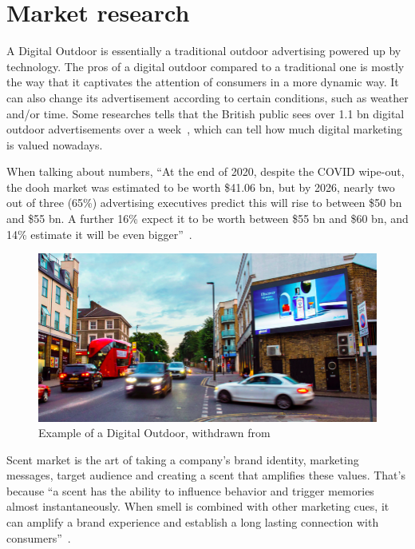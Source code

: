 \section{Market research}
\label{sec:market-research}
A Digital Outdoor is essentially a traditional outdoor advertising powered up by technology. 
The pros of a digital outdoor compared to a traditional one is mostly the way that it captivates the attention of consumers in a more dynamic way. 
It can also change its advertisement according to certain conditions, such as
weather and/or time. Some researches tells that the British public sees over 1.1
\gls{bn} digital outdoor advertisements over a week~\cite{digital-outdoor},
which can tell how much digital marketing is valued nowadays.

When talking about numbers, ``At the end of 2020, despite the COVID wipe-out, the \gls{dooh} market was estimated to be worth \$41.06 \gls{bn}, but by 2026, nearly two out of three (65\%) advertising executives predict this will rise to between \$50 \gls{bn} and \$55 \gls{bn}. 
A further 16\% expect it to be worth between \$55 \gls{bn} and \$60 \gls{bn}, and 14\% estimate it will be even bigger''~\cite{outdoor-market}.
%
\begin{figure}[htb!]
\centering
    \includegraphics[width=0.7\columnwidth]{./img/DigitalOutdoor.png}
  \caption{Example of a Digital Outdoor, withdrawn from~\cite{digital-outdoor}}%
\label{fig:dig-outdoor}
\end{figure}

Scent market is the art of taking a company's brand identity, marketing messages, target audience and creating a scent that amplifies these values. 
That's because ``a scent has the ability to influence behavior and trigger memories almost instantaneously. When smell is combined with other marketing cues, it can amplify a brand experience and establish a long lasting connection with consumers''~\cite{scent-market}.

